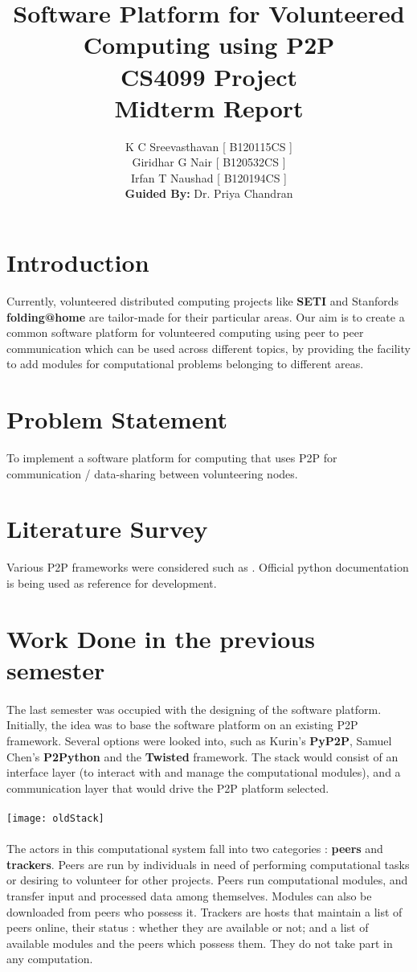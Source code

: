 \documentclass[a4paper,11pt,twocolumn]{article}
\title{Software Platform for Volunteered Computing using P2P\\ {\normalsize CS4099 Project\\Midterm Report}}
\author{K C Sreevasthavan [ B120115CS ]\\ Giridhar G Nair [ B120532CS ]\\ Irfan T Naushad [ B120194CS ]\\\textbf{Guided By:} Dr. Priya Chandran}
\begin{document}
\maketitle
\section{Introduction}
Currently, volunteered distributed computing projects like \textbf{SETI} and Stanford\textquotesingle s \textbf{folding@home} are tailor-made for their particular areas. Our aim is to create a common software platform for volunteered computing using peer to peer communication which can be used across different topics, by providing the facility to add modules for computational problems belonging to different areas.
\section{Problem Statement}
To implement a software platform for computing that uses P2P for communication / data-sharing between volunteering nodes.
\section{Literature Survey }
Various P2P frameworks were considered such as \cite{kurin} \cite{chen} \cite{twisted}. Official python documentation \cite{python} is being used as reference for development.
\section{Work Done in the previous semester}
\paragraph{}
The last semester was occupied with the designing of the software platform. Initially, the idea was to base the software platform on an existing P2P framework. Several options were looked into, such as Kurin's \textbf{PyP2P}, Samuel Chen's \textbf{P2Python} and the \textbf{Twisted} framework. The stack would consist of an interface layer (to interact with and manage the computational modules), and a communication layer that would drive the P2P platform selected.
\paragraph{}
\texttt{[image: oldStack]}
\paragraph{}
The actors in this computational system fall into two categories : \textbf{peers} and \textbf{trackers}. Peers are run by individuals in need of performing computational tasks or desiring to volunteer for other projects. Peers run computational modules, and transfer input and processed data among themselves. Modules can also be downloaded from peers who possess it. Trackers are hosts that maintain a list of peers online, their status : whether they are available or not; and a list of available modules and the peers which possess them. They do not take part in any computation.
\end{document}
